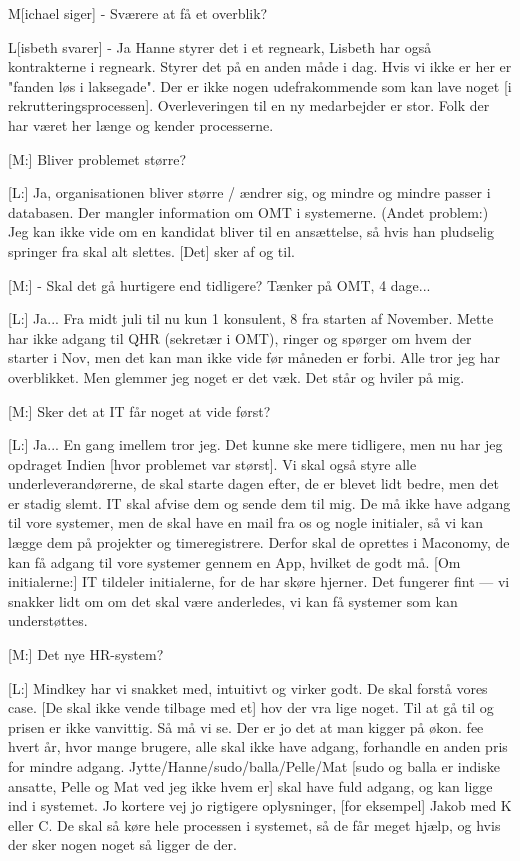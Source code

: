 M[ichael siger] - Sværere at få et overblik?

L[isbeth svarer] - Ja
Hanne styrer det i et regneark, Lisbeth har også kontrakterne i regneark. Styrer det på en anden måde i dag. Hvis vi ikke er her er "fanden løs i laksegade". Der er ikke nogen udefrakommende som kan lave noget [i rekrutteringsprocessen]. Overleveringen til en ny medarbejder er stor. Folk der har været her længe og kender processerne.

[M:] Bliver problemet større?

[L:] Ja, organisationen bliver større / ændrer sig, og mindre og mindre passer i databasen. Der mangler information om OMT i systemerne. 
(Andet problem:)
Jeg kan ikke vide om en kandidat bliver til en ansættelse, så hvis han pludselig springer fra skal alt slettes. [Det] sker af og til.

[M:] - Skal det gå hurtigere end tidligere? Tænker på OMT, 4 dage...

[L:] Ja... Fra midt juli til nu kun 1 konsulent, 8 fra starten af November. Mette har ikke adgang til QHR (sekretær i OMT), ringer og spørger om hvem der starter i Nov, men det kan man ikke vide før måneden er forbi. Alle tror jeg har overblikket. Men glemmer jeg noget er det væk. Det står og hviler på mig.

[M:] Sker det at IT får noget at vide først?

[L:] Ja... En gang imellem tror jeg. Det kunne ske mere tidligere, men nu har jeg opdraget Indien [hvor problemet var størst]. Vi skal også styre alle underleverandørerne, de skal starte dagen efter, de er blevet lidt bedre, men det er stadig slemt. IT skal afvise dem og sende dem til mig. De må ikke have adgang til vore systemer, men de skal have en mail fra os og nogle initialer, så vi kan lægge dem på projekter og timeregistrere. Derfor skal de oprettes i Maconomy, de kan få adgang til vore systemer gennem en App, hvilket de godt må. [Om initialerne:] IT tildeler initialerne, for de har skøre hjerner. Det fungerer fint --- vi snakker lidt om om det skal være anderledes, vi kan få systemer som kan understøttes.

[M:] Det nye HR-system?

[L:] Mindkey har vi snakket med, intuitivt og virker godt. De skal forstå vores case. [De skal ikke vende tilbage med et] hov der vra lige noget. Til at gå til og prisen er ikke vanvittig. Så må vi se. Der er jo det at man kigger på økon. fee hvert år, hvor mange brugere, alle skal ikke have adgang, forhandle en anden pris for mindre adgang. Jytte/Hanne/sudo/balla/Pelle/Mat [sudo og balla er indiske ansatte, Pelle og Mat ved jeg ikke hvem er] skal have fuld adgang, og kan ligge ind i systemet. Jo kortere vej jo rigtigere oplysninger, [for eksempel] Jakob med K eller C. De skal så køre hele processen i systemet, så de får meget hjælp, og hvis der sker nogen noget så ligger de der.

